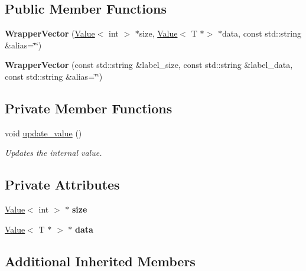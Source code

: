\subsection*{Public Member Functions}
\begin{DoxyCompactItemize}
\item 
\hypertarget{classfv_1_1WrapperVector_a2bc64820fe35a31f58971c8ed3c28a7a}{}\label{classfv_1_1WrapperVector_a2bc64820fe35a31f58971c8ed3c28a7a} 
{\bfseries Wrapper\+Vector} (\hyperlink{classfv_1_1Value}{Value}$<$ int $>$ $\ast$size, \hyperlink{classfv_1_1Value}{Value}$<$ T $\ast$$>$ $\ast$data, const std\+::string \&alias=\char`\"{}\char`\"{})
\item 
\hypertarget{classfv_1_1WrapperVector_a07359f0cfd9e1656827375bb68f0f0a4}{}\label{classfv_1_1WrapperVector_a07359f0cfd9e1656827375bb68f0f0a4} 
{\bfseries Wrapper\+Vector} (const std\+::string \&label\+\_\+size, const std\+::string \&label\+\_\+data, const std\+::string \&alias=\char`\"{}\char`\"{})
\end{DoxyCompactItemize}
\subsection*{Private Member Functions}
\begin{DoxyCompactItemize}
\item 
void \hyperlink{classfv_1_1WrapperVector_a2ee99bc4425642d209df7b48ee2ada95}{update\+\_\+value} ()
\begin{DoxyCompactList}\small\item\em Updates the internal value. \end{DoxyCompactList}\end{DoxyCompactItemize}
\subsection*{Private Attributes}
\begin{DoxyCompactItemize}
\item 
\hypertarget{classfv_1_1WrapperVector_a10ede4104152047ed9561cf53760c56a}{}\label{classfv_1_1WrapperVector_a10ede4104152047ed9561cf53760c56a} 
\hyperlink{classfv_1_1Value}{Value}$<$ int $>$ $\ast$ {\bfseries size}
\item 
\hypertarget{classfv_1_1WrapperVector_a28f084653f04d7c3b02b0deca2e425a7}{}\label{classfv_1_1WrapperVector_a28f084653f04d7c3b02b0deca2e425a7} 
\hyperlink{classfv_1_1Value}{Value}$<$ T $\ast$ $>$ $\ast$ {\bfseries data}
\end{DoxyCompactItemize}
\subsection*{Additional Inherited Members}


